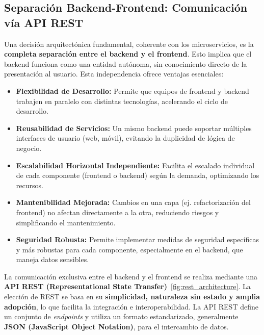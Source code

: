\subsection{Separación Backend-Frontend: Comunicación vía API REST}

Una decisión arquitectónica fundamental, coherente con los microservicios, es la \textbf{completa separación entre el backend y el frontend}. Esto implica que el backend funciona como una entidad autónoma, sin conocimiento directo de la presentación al usuario. Esta independencia ofrece ventajas esenciales:

\begin{itemize}
    \item \textbf{Flexibilidad de Desarrollo:} Permite que equipos de frontend y backend trabajen en paralelo con distintas tecnologías, acelerando el ciclo de desarrollo.
    \item \textbf{Reusabilidad de Servicios:} Un mismo backend puede soportar múltiples interfaces de usuario (web, móvil), evitando la duplicidad de lógica de negocio.
    \item \textbf{Escalabilidad Horizontal Independiente:} Facilita el escalado individual de cada componente (frontend o backend) según la demanda, optimizando los recursos.
    \item \textbf{Mantenibilidad Mejorada:} Cambios en una capa (ej. refactorización del frontend) no afectan directamente a la otra, reduciendo riesgos y simplificando el mantenimiento.
    \item \textbf{Seguridad Robusta:} Permite implementar medidas de seguridad específicas y más robustas para cada componente, especialmente en el backend, que maneja datos sensibles.
\end{itemize}

La comunicación exclusiva entre el backend y el frontend se realiza mediante una \textbf{API REST (Representational State Transfer)}~\ref{fig:rest_architecture}. La elección de REST se basa en su \textbf{simplicidad, naturaleza sin estado y amplia adopción}, lo que facilita la integración e interoperabilidad. La API REST define un conjunto de \textit{endpoints} y utiliza un formato estandarizado, generalmente \textbf{JSON (JavaScript Object Notation)}, para el intercambio de datos.

